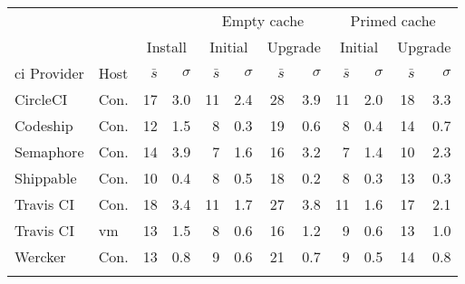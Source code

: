 
\newcommand*\mean{$\bar{s}$}
\begin{tabular}{ l l r r|r r|r r|r r|r r|}
  & & & & \multicolumn{4}{c|}{Empty cache} & \multicolumn{4}{c|}{Primed cache} \\
  & & \multicolumn{2}{c|}{Install} & \multicolumn{2}{c|}{Initial} & \multicolumn{2}{c|}{Upgrade} & \multicolumn{2}{c|}{Initial} & \multicolumn{2}{c|}{Upgrade} \\
  \acrshort{ci} Provider & Host & \mean & $\sigma$ & \mean & $\sigma$ & \mean & $\sigma$ & \mean & $\sigma$ & \mean & $\sigma$ \\
  \hhline{====|==|==|==|==|}
  CircleCI & Con. & 17 & 3.0 & 11 & 2.4 & 28 & 3.9 & 11 & 2.0 & 18 & 3.3 \\
  \hline
Codeship & Con. & 12 & 1.5 & 8 & 0.3 & 19 & 0.6 & 8 & 0.4 & 14 & 0.7 \\
  \hline
Semaphore & Con. & 14 & 3.9 & 7 & 1.6 & 16 & 3.2 & 7 & 1.4 & 10 & 2.3 \\
  \hline
Shippable & Con. & 10 & 0.4 & 8 & 0.5 & 18 & 0.2 & 8 & 0.3 & 13 & 0.3 \\
  \hline
Travis CI & Con. & 18 & 3.4 & 11 & 1.7 & 27 & 3.8 & 11 & 1.6 & 17 & 2.1 \\
  \hline
Travis CI & \acrshort{vm} & 13 & 1.5 & 8 & 0.6 & 16 & 1.2 & 9 & 0.6 & 13 & 1.0 \\
  \hline
Wercker & Con. & 13 & 0.8 & 9 & 0.6 & 21 & 0.7 & 9 & 0.5 & 14 & 0.8 \\
  \hhline{====|==|==|==|==|}
  
\end{tabular}

